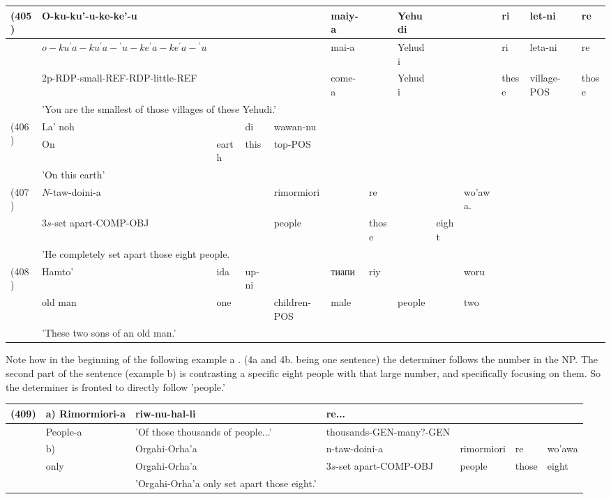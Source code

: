 \documentclass[10pt]{article}
\begin{document}
\begin{center}
\begin{tabular}{|l|l|l|l|l|l|l|l|l|l|l|l|l|}
\hline
\multirow[t]{4}{*}{(405)} & O-ku-ku'-u-ke-ke'-u &  &  &  & maiy-a &  & Yehudi &  &  & ri & let-ni & re \\
\hline
 & \(o-k u^{\prime} a-k u^{\prime} a-{ }^{\prime} u-k e^{\prime} a-k e^{\prime} a-{ }^{\prime} u\) &  &  &  & mai-a &  & Yehudi &  &  & ri & leta-ni & re \\
\hline
 & 2p-RDP-small-REF-RDP-little-REF &  &  &  & come-a &  & Yehudi &  &  & these & village-POS & those \\
\hline
 & \multicolumn{12}{|l|}{'You are the smallest of those villages of these Yehudi.'} \\
\hline
\multirow[t]{3}{*}{(406)} & La' noh &  & di & wawan-nu &  &  &  &  &  &  &  &  \\
\hline
 & On & earth & this & top-POS &  &  &  &  &  &  &  &  \\
\hline
 & 'On this earth' &  &  &  &  &  &  &  &  &  &  &  \\
\hline
\multirow[t]{3}{*}{(407)} & \(N\)-taw-doini-a &  &  & rimormiori &  & re &  &  & wo'awa. &  &  &  \\
\hline
 & \(3 s\)-set apart-COMP-OBJ &  &  & people &  & those &  & eight &  &  &  &  \\
\hline
 & \multicolumn{12}{|l|}{'He completely set apart those eight people.} \\
\hline
\multirow[t]{3}{*}{(408)} & Hamto' & ida & up-ni &  & тиапи & riy &  &  & woru &  &  &  \\
\hline
 & old man & one &  & children-POS & male &  & people &  & two &  &  &  \\
\hline
 & 'These two sons of an old man.' &  &  &  &  &  &  &  &  &  &  &  \\
\hline
\end{tabular}
\end{center}

Note how in the beginning of the following example a . (4a and 4b. being one sentence) the determiner follows the number in the NP. The second part of the sentence (example b) is contrasting a specific eight people with that large number, and specifically focusing on them. So the determiner is fronted to directly follow 'people.'

\begin{center}
\begin{tabular}{|l|l|l|l|l|l|l|}
\hline
(409) & a) Rimormiori-a & riw-nu-hal-li & re... &  &  &  \\
\hline
 & People-a & 'Of those thousands of people...' & thousands-GEN-many?-GEN &  &  &  \\
\hline
 & b) & Orgahi-Orha'a & n-taw-doini-a & rimormiori & re & wo'awa \\
\hline
 & only & Orgahi-Orha'a & \(3 s\)-set apart-COMP-OBJ & people & those & eight \\
\hline
 &  & 'Orgahi-Orha'a only set apart those eight.' &  &  &  &  \\
\hline
\end{tabular}
\end{center}
\end{document}
